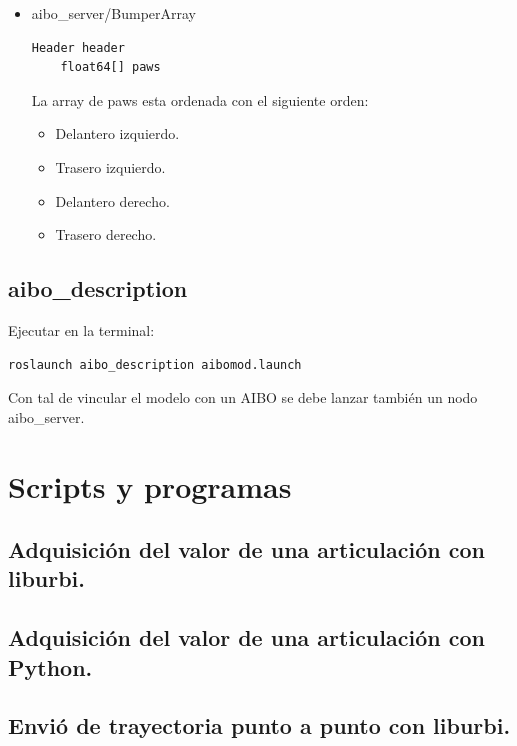 \documentclass[12pt,a4paper,final,twoside]{book}
\begin{document}
\begin{itemize}
\begin{itemize}
\end{itemize}
\item aibo{\_}server/BumperArray
\begin{lstlisting}[language=bash]
	Header header
	float64[] paws
\end{lstlisting}

La array de paws esta ordenada con el siguiente orden:
\begin{itemize}
\item Delantero izquierdo.
\item Trasero izquierdo.
\item Delantero derecho.
\item Trasero derecho.
\end{itemize}
\end{itemize}

\section{aibo{\_}description}
Ejecutar en la terminal:
\begin{lstlisting}[language=bash]
	roslaunch aibo_description aibomod.launch
\end{lstlisting}


Con tal de vincular el modelo con un AIBO se debe lanzar también un nodo aibo{\_}server.

\newpage

\chapter{Scripts y programas}
\thispagestyle{fancy}
\section{Adquisición del valor de una articulación con liburbi.}
\label{getDataOneLegC++}


\section{Adquisición del valor de una articulación con Python.}
\label{getDataOneLegPy}


\section{Envió de trayectoria punto a punto con liburbi.}\label{sinC}

\end{document}
